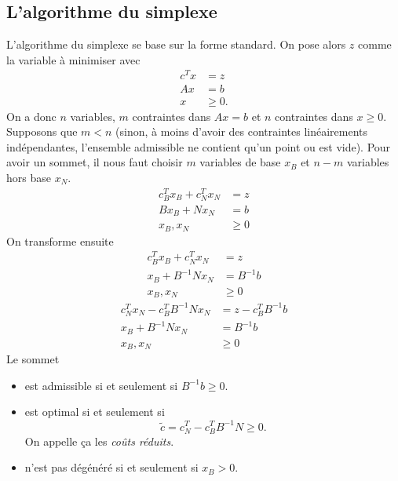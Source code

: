 \subsection{L'algorithme du simplexe}
L'algorithme du simplexe se base sur la forme standard.
On pose alors $z$ comme la variable à minimiser avec
\begin{align*}
  c^T x & = z\\
  Ax & = b\\
  x & \geq 0.
\end{align*}
On a donc $n$ variables,
$m$ contraintes dans $Ax = b$ et
$n$ contraintes dans $x \geq 0$.
Supposons que $m < n$ (sinon, à moins d'avoir des contraintes linéairements
indépendantes, l'ensemble admissible ne contient qu'un point ou est vide).
Pour avoir un sommet, il nous faut choisir
$m$ variables de base $x_B$ et $n-m$ variables hors base $x_N$.
\begin{align*}
  c_B^Tx_B + c_N^Tx_N & = z\\
  Bx_B + Nx_N & = b\\
  x_B,x_N & \geq 0
\end{align*}
On transforme ensuite
\begin{align*}
  c_B^Tx_B + c_N^Tx_N & = z\\
  x_B + B^{-1}Nx_N & = B^{-1}b\\
  x_B, x_N & \geq 0
\end{align*}
\begin{align*}
  c_N^Tx_N-c_B^TB^{-1}Nx_N & = z - c_B^TB^{-1}b\\
  x_B + B^{-1}Nx_N & = B^{-1}b\\
  x_B, x_N & \geq 0
\end{align*}
Le sommet
\begin{itemize}
  \item est admissible si et seulement si $B^{-1}b \geq 0$.
  \item est optimal si et seulement si
    \[ \tilde{c} = c_N^T - c_B^TB^{-1}N \geq 0. \]
    On appelle ça les \emph{coûts réduits}.
  \item n'est pas dégénéré si et seulement si $x_B > 0$.
\end{itemize}
